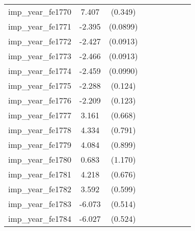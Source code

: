 {\begin{tabular}{l*{4}{cc}}
imp\_year\_fe1770&    7.407\sym{***}&  (0.349)&                  &         &                  &         &                  &         \\
imp\_year\_fe1771&   -2.395\sym{***}& (0.0899)&                  &         &                  &         &                  &         \\
imp\_year\_fe1772&   -2.427\sym{***}& (0.0913)&                  &         &                  &         &                  &         \\
imp\_year\_fe1773&   -2.466\sym{***}& (0.0913)&                  &         &                  &         &                  &         \\
imp\_year\_fe1774&   -2.459\sym{***}& (0.0990)&                  &         &                  &         &                  &         \\
imp\_year\_fe1775&   -2.288\sym{***}&  (0.124)&                  &         &                  &         &                  &         \\
imp\_year\_fe1776&   -2.209\sym{***}&  (0.123)&                  &         &                  &         &                  &         \\
imp\_year\_fe1777&    3.161\sym{***}&  (0.668)&                  &         &                  &         &                  &         \\
imp\_year\_fe1778&    4.334\sym{***}&  (0.791)&                  &         &                  &         &                  &         \\
imp\_year\_fe1779&    4.084\sym{***}&  (0.899)&                  &         &                  &         &                  &         \\
imp\_year\_fe1780&    0.683         &  (1.170)&                  &         &                  &         &                  &         \\
imp\_year\_fe1781&    4.218\sym{***}&  (0.676)&                  &         &                  &         &                  &         \\
imp\_year\_fe1782&    3.592\sym{***}&  (0.599)&                  &         &                  &         &                  &         \\
imp\_year\_fe1783&   -6.073\sym{***}&  (0.514)&                  &         &                  &         &                  &         \\
imp\_year\_fe1784&   -6.027\sym{***}&  (0.524)&                  &         &                  &         &                  &         \\

\end{tabular}}
